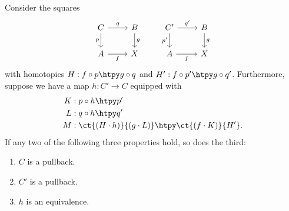 \begin{thm}\label{thm:pb_3for2}
Consider the squares
\begin{equation*}
\begin{tikzcd}
C \arrow[r,"q"] \arrow[d,swap,"p"] & B \arrow[d,"g"] & {C'} \arrow[r,"{q'}"] \arrow[d,swap,"{p'}"] & B \arrow[d,"g"] \\
A \arrow[r,swap,"f"] & X & A \arrow[r,swap,"f"] & X
\end{tikzcd}
\end{equation*}
with homotopies $H:f\circ p \htpy g\circ q$ and $H':f\circ p'\htpy g\circ q'$.
Furthermore, suppose we have a map $h:C'\to C$ equipped with
\begin{align*}
K & : p\circ h \htpy p' \\
L & : q\circ h \htpy q' \\
M & : \ct{(H\cdot h)}{(g\cdot L)} \htpy \ct{(f\cdot K)}{H'}.
\end{align*}
If any two of the following three properties hold, so does the third:
\begin{samepage}%
\begin{enumerate}
\item $C$ is a pullback.
\item $C'$ is a pullback.
\item $h$ is an equivalence.
\end{enumerate}%
\end{samepage}%
\end{thm}

